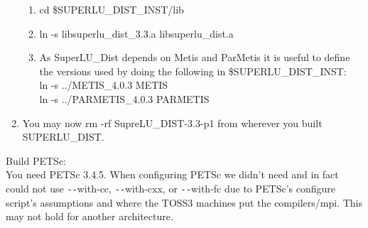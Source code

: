 \documentclass[11pt]{amsart}
\begin{document}
\begin{enumerate}
\begin{enumerate}
\item cd \$SUPERLU\_DIST\_INST/lib
\item ln -s libsuperlu\_dist\_3.3.a libsuperlu\_dist.a
\item As SuperLU\_Dist depends on Metis and ParMetis it is useful to define
the versions used by doing the following in \$SUPERLU\_DIST\_INST: \\
ln -s ../METIS\_4.0.3 METIS \\
ln -s ../PARMETIS\_4.0.3 PARMETIS
\end{enumerate}
\item You may now rm -rf SupreLU\_DIST-3.3-p1 from wherever you built \\
SUPERLU\_DIST.
\end{enumerate}

Build PETSc: \\
You need PETSc 3.4.5.  When configuring PETSc we didn't need and in fact could
not use \texttt{-{}-}with-cc, \texttt{-{}-}with-cxx, or \texttt{-{}-}with-fc
due to PETSc's configure script's assumptions and where the TOSS3 machines put
the compilers/mpi.  This may not hold for another architecture.
\end{document}
